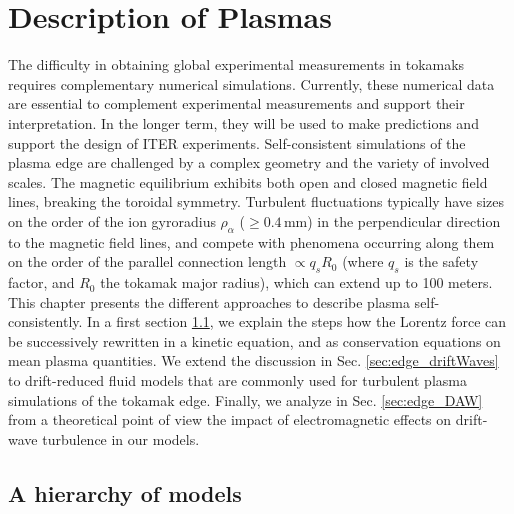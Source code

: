 \chapter{Description of Plasmas}
\label{chap:PlasmaSimulations}


The difficulty in obtaining global experimental measurements in tokamaks requires complementary numerical simulations. Currently, these numerical data are essential to complement experimental measurements and support their interpretation. In the longer term, they will be used to make predictions and support the design of ITER experiments. Self-consistent simulations of the plasma edge are challenged by a complex geometry and the variety of involved scales. The magnetic equilibrium exhibits both open and closed magnetic field lines, breaking the toroidal symmetry. Turbulent fluctuations typically have sizes on the order of the ion gyroradius $\rho_\alpha$ ($\ge 0.4\, \text{mm}$) \cite{hennequin2004} in the perpendicular direction to the magnetic field lines, and compete with phenomena occurring along them on the order of the parallel connection length $\propto q_s R_0$ (where $q_s$ is the safety factor, and $R_0$ the tokamak major radius), which can extend up to 100 meters. \\

This chapter presents the different approaches to describe plasma self-consistently. In a first section \ref{sec:desc_modelHierarchy}, we explain the steps how the Lorentz force can be successively rewritten in a kinetic equation, and as conservation equations on mean plasma quantities. We extend the discussion in Sec. \ref{sec:edge_driftWaves} to drift-reduced fluid models that are commonly used for turbulent plasma simulations of the tokamak edge. Finally, we analyze in Sec. \ref{sec:edge_DAW} from a theoretical point of view the impact of electromagnetic effects on drift-wave turbulence in our models. 


\section{A hierarchy of models}
\label{sec:desc_modelHierarchy}

